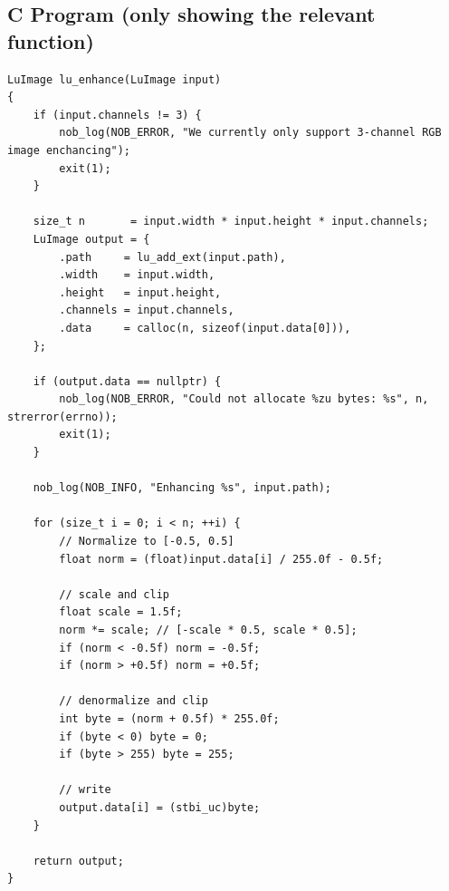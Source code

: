 \documentclass[
    12pt
]{article}
\begin{document}
\newpage
\subsection{C Program (only showing the relevant function)}
\begin{verbatim}
LuImage lu_enhance(LuImage input)
{
	if (input.channels != 3) {
		nob_log(NOB_ERROR, "We currently only support 3-channel RGB image enchancing");
		exit(1);
	}

	size_t n       = input.width * input.height * input.channels;
	LuImage output = {
		.path     = lu_add_ext(input.path),
		.width    = input.width,
		.height   = input.height,
		.channels = input.channels,
		.data     = calloc(n, sizeof(input.data[0])),
	};

	if (output.data == nullptr) {
		nob_log(NOB_ERROR, "Could not allocate %zu bytes: %s", n, strerror(errno));
		exit(1);
	}

	nob_log(NOB_INFO, "Enhancing %s", input.path);

	for (size_t i = 0; i < n; ++i) {
		// Normalize to [-0.5, 0.5]
		float norm = (float)input.data[i] / 255.0f - 0.5f;

		// scale and clip
		float scale = 1.5f;
		norm *= scale; // [-scale * 0.5, scale * 0.5];
		if (norm < -0.5f) norm = -0.5f;
		if (norm > +0.5f) norm = +0.5f;

		// denormalize and clip
		int byte = (norm + 0.5f) * 255.0f;
		if (byte < 0) byte = 0;
		if (byte > 255) byte = 255;

		// write
		output.data[i] = (stbi_uc)byte;
	}

	return output;
}
\end{verbatim}
\end{document}

